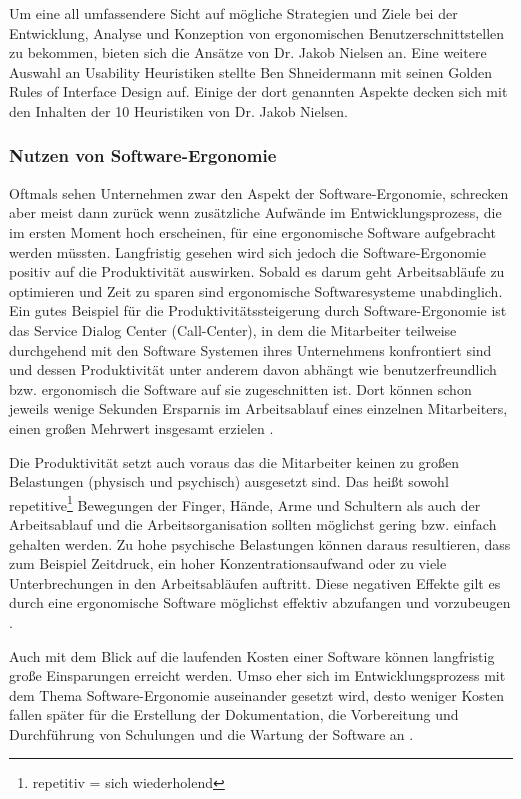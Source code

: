Um eine all umfassendere Sicht auf mögliche Strategien und Ziele bei der Entwicklung, Analyse und Konzeption von ergonomischen Benutzerschnittstellen zu bekommen, bieten sich die Ansätze von Dr. Jakob Nielsen an. Eine weitere Auswahl an Usability Heuristiken stellte Ben Shneidermann mit seinen  Golden Rules of Interface Design \grqq{} \citep{Wong2018} auf. Einige der dort genannten Aspekte decken sich mit den Inhalten der 10 Heuristiken von Dr. Jakob Nielsen.

\subsubsection{Nutzen von Software-Ergonomie}
Oftmals sehen Unternehmen zwar den Aspekt der Software-Ergonomie, schrecken aber meist dann zurück wenn zusätzliche Aufwände im Entwicklungsprozess, die im ersten Moment hoch erscheinen, für eine ergonomische Software aufgebracht werden müssten. Langfristig gesehen wird sich jedoch die Software-Ergonomie positiv auf die Produktivität auswirken. Sobald es darum geht Arbeitsabläufe zu optimieren und Zeit zu sparen sind ergonomische Softwaresysteme unabdinglich. Ein gutes Beispiel für die Produktivitätssteigerung durch Software-Ergonomie ist das Service Dialog Center (Call-Center), in dem die Mitarbeiter teilweise durchgehend mit den Software Systemen ihres Unternehmens konfrontiert sind und dessen Produktivität unter anderem davon abhängt wie benutzerfreundlich bzw. ergonomisch die Software auf sie zugeschnitten ist. Dort können schon jeweils wenige Sekunden Ersparnis im Arbeitsablauf eines einzelnen Mitarbeiters, einen großen Mehrwert insgesamt erzielen \citep[vgl.][19]{Pruemper_Harten2007}.

Die Produktivität setzt auch voraus das die Mitarbeiter keinen zu großen Belastungen (physisch und psychisch) ausgesetzt sind. Das heißt sowohl repetitive\footnote{repetitiv = sich wiederholend} Bewegungen der Finger, Hände, Arme und Schultern als auch der Arbeitsablauf und die Arbeitsorganisation sollten möglichst gering bzw. einfach gehalten werden. Zu hohe psychische Belastungen können daraus resultieren, dass zum Beispiel Zeitdruck, ein hoher Konzentrationsaufwand oder zu viele Unterbrechungen in den Arbeitsabläufen auftritt. Diese negativen Effekte gilt es durch eine ergonomische Software möglichst effektiv abzufangen und vorzubeugen \citep[vgl.][19]{Pruemper_Harten2007}.

Auch mit dem Blick auf die laufenden Kosten einer Software können langfristig große Einsparungen erreicht werden. Umso eher sich im Entwicklungsprozess mit dem Thema Software-Ergonomie auseinander gesetzt wird, desto weniger Kosten fallen später für die Erstellung der Dokumentation, die Vorbereitung und Durchführung von Schulungen und die Wartung der Software an \citep[vgl.][19]{Pruemper_Harten2007}.

